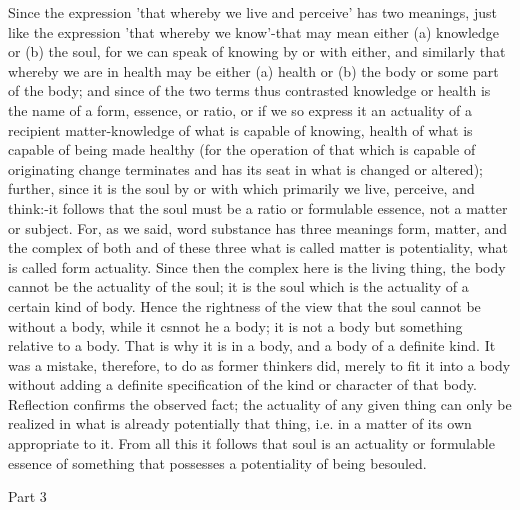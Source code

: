 Since the expression 'that whereby we live and perceive' has two meanings,
just like the expression 'that whereby we know'-that may mean either
(a) knowledge or (b) the soul, for we can speak of knowing by or with
either, and similarly that whereby we are in health may be either
(a) health or (b) the body or some part of the body; and since of
the two terms thus contrasted knowledge or health is the name of a
form, essence, or ratio, or if we so express it an actuality of a
recipient matter-knowledge of what is capable of knowing, health of
what is capable of being made healthy (for the operation of that which
is capable of originating change terminates and has its seat in what
is changed or altered); further, since it is the soul by or with which
primarily we live, perceive, and think:-it follows that the soul must
be a ratio or formulable essence, not a matter or subject. For, as
we said, word substance has three meanings form, matter, and the complex
of both and of these three what is called matter is potentiality,
what is called form actuality. Since then the complex here is the
living thing, the body cannot be the actuality of the soul; it is
the soul which is the actuality of a certain kind of body. Hence the
rightness of the view that the soul cannot be without a body, while
it csnnot he a body; it is not a body but something relative to a
body. That is why it is in a body, and a body of a definite kind.
It was a mistake, therefore, to do as former thinkers did, merely
to fit it into a body without adding a definite specification of the
kind or character of that body. Reflection confirms the observed fact;
the actuality of any given thing can only be realized in what is already
potentially that thing, i.e. in a matter of its own appropriate to
it. From all this it follows that soul is an actuality or formulable
essence of something that possesses a potentiality of being besouled.

Part 3

